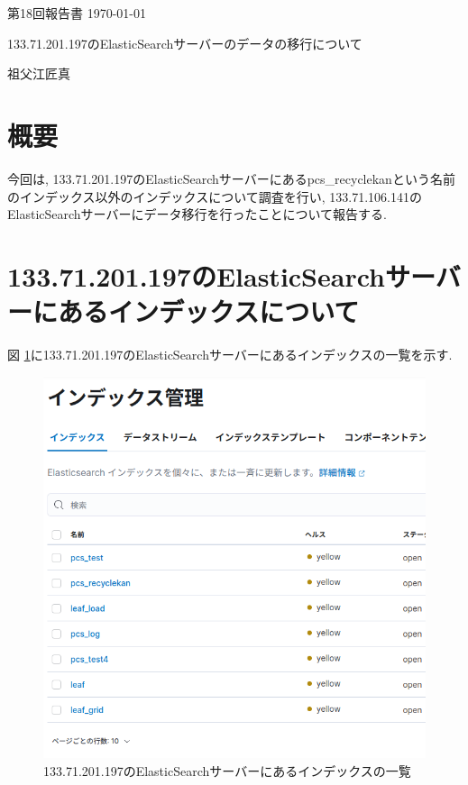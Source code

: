 \documentclass[a4j,12pt,]{jarticle}
\begin{document}
{\noindent\small 第18回報告書 \hfill\today}
\begin{center}
  {\Large 133.71.201.197のElasticSearchサーバーのデータの移行について}
\end{center}
\begin{flushright}
  祖父江匠真 \\
\end{flushright}

\section{概要}
今回は, 133.71.201.197のElasticSearchサーバーにあるpcs\_recyclekanという名前のインデックス以外のインデックスについて調査を行い, 133.71.106.141のElasticSearchサーバーにデータ移行を行ったことについて報告する.

\section{133.71.201.197のElasticSearchサーバーにあるインデックスについて}
図 \ref{p1}に133.71.201.197のElasticSearchサーバーにあるインデックスの一覧を示す.

\begin{figure}[H]
  \begin{center}
    \includegraphics[width=160mm]{indexes.png}
    \caption{133.71.201.197のElasticSearchサーバーにあるインデックスの一覧}
    \label{p1}
  \end{center}
\end{figure}
\end{document}
